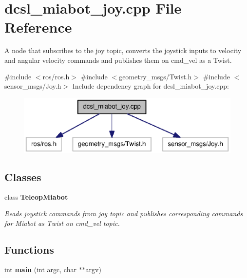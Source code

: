 \section{dcsl\-\_\-miabot\-\_\-joy.\-cpp \-File \-Reference}
\label{dcsl__miabot__joy_8cpp}


\-A node that subscribes to the joy topic, converts the joystick inputs to velocity and angular velocity commands and publishes them on cmd\-\_\-vel as a \-Twist.  


{\ttfamily \#include $<$ros/ros.\-h$>$}\*
{\ttfamily \#include $<$geometry\-\_\-msgs/\-Twist.\-h$>$}\*
{\ttfamily \#include $<$sensor\-\_\-msgs/\-Joy.\-h$>$}\*
\-Include dependency graph for dcsl\-\_\-miabot\-\_\-joy.\-cpp\-:
\nopagebreak
\begin{figure}[H]
\begin{center}
\leavevmode
\includegraphics[width=350pt]{dcsl__miabot__joy_8cpp__incl}
\end{center}
\end{figure}
\subsection*{\-Classes}
\begin{DoxyCompactItemize}
\item 
class {\bf \-Teleop\-Miabot}
\begin{DoxyCompactList}\small\item\em \-Reads joystick commands from joy topic and publishes corresponding commands for \-Miabot as \-Twist on cmd\-\_\-vel topic. \end{DoxyCompactList}\end{DoxyCompactItemize}
\subsection*{\-Functions}
\begin{DoxyCompactItemize}
\item 
int {\bf main} (int argc, char $\ast$$\ast$argv)
\end{DoxyCompactItemize}


